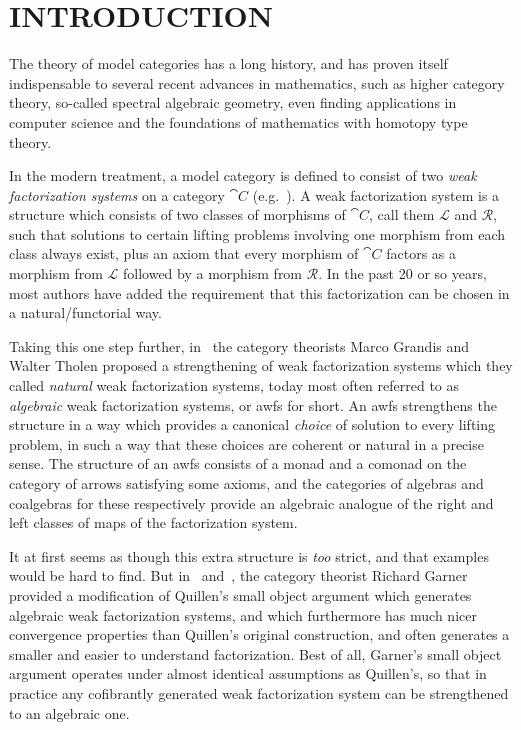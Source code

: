 
\chapter{INTRODUCTION}

The theory of model categories has a long history, and has proven itself indispensable to several recent advances in mathematics, such as higher category theory, so-called spectral algebraic geometry, even finding applications in computer science and the foundations of mathematics with homotopy type theory.

In the modern treatment, a model category is defined to consist of two \emph{weak factorization systems} on a category $\cat{C}$ (e.g.~\cite{mp:more-concise}). A weak factorization system is a structure which consists of two classes of morphisms of $\cat{C}$, call them $\mathcal{L}$ and $\mathcal{R}$, such that solutions to certain lifting problems involving one morphism from each class always exist, plus an axiom that every morphism of $\cat{C}$ factors as a morphism from $\mathcal{L}$ followed by a morphism from $\mathcal{R}$. In the past 20 or so years, most authors have added the requirement that this factorization can be chosen in a natural/functorial way.

Taking this one step further, in~\cite{gt:nwfs} the category theorists Marco Grandis and Walter Tholen proposed a strengthening of weak factorization systems which they called \emph{natural} weak factorization systems, today most often referred to as \emph{algebraic} weak factorization systems, or awfs for short. An awfs strengthens the structure in a way which provides a canonical \emph{choice} of solution to every lifting problem, in such a way that these choices are coherent or natural in a precise sense. The structure of an awfs consists of a monad and a comonad on the category of arrows satisfying some axioms, and the categories of algebras and coalgebras for these respectively provide an algebraic analogue of the right and left classes of maps of the factorization system.

It at first seems as though this extra structure is \emph{too} strict, and that examples would be hard to find. But in~\cite{garner:nwfs} and~\cite{garner:soa}, the category theorist Richard Garner provided a modification of Quillen's small object argument which generates algebraic weak factorization systems, and which furthermore has much nicer convergence properties than Quillen's original construction, and often generates a smaller and easier to understand factorization. Best of all, Garner's small object argument operates under almost identical assumptions as Quillen's, so that in practice any cofibrantly generated weak factorization system can be strengthened to an algebraic one.

